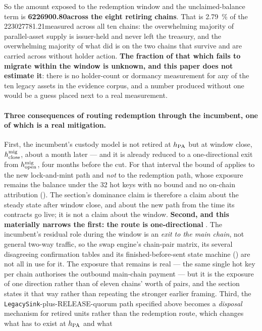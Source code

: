 \noindent So the amount exposed to the redemption window and the unclaimed-balance term is
\textbf{\num{6226900.80}\flux across the eight retiring chains}. That is \SI{2.79}{\percent} of
the \num{223027781.21}\flux measured across all ten chains: the overwhelming majority of parallel-asset supply is
issuer-held and never left the treasury, and the overwhelming majority of what did is on the two
chains that survive and are carried across without holder action. \textbf{The fraction of that which fails to migrate
within the window is unknown, and this paper does not estimate it}: there is no holder-count or
dormancy measurement for any of the ten legacy assets in the evidence corpus, and a number produced
without one would be a guess placed next to a real measurement.

\paragraph{Three consequences of routing redemption through the incumbent, one of which is a real
mitigation.} First, the incumbent's custody model is not retired at $h_{\mathrm{PA}}$ but at window close, $h^{\mathrm{mig}}_{\mathrm{close}}$,
about a month later --- and it is already reduced to a one-directional exit from $h^{\mathrm{mig}}_{\mathrm{open}}$, four
months before the cut. For that interval the bound of  applies to the new
lock-and-mint path and \emph{not} to the redemption path, whose exposure remains the balance under
the 32 hot keys with no bound and no on-chain attribution (). The section's
dominance claim is therefore a claim about the steady state after window close, and about the new
path from the time its contracts go live; it is not a claim about the window. \textbf{Second, and this materially narrows
the first: the route is one-directional} . The incumbent's
residual role during the window is an \emph{exit to the main chain}, not general two-way traffic, so
the swap engine's chain-pair matrix, its several disagreeing confirmation tables and its
finished-before-sent state machine () are not all in use for it. The
exposure that remains is real --- the same single hot key per chain authorises the outbound main-chain
payment --- but it is the exposure of one direction rather than of eleven chains' worth of pairs, and
the section states it that way rather than repeating the stronger earlier framing. Third, the
\texttt{LegacySink}-plus-RELEASE-quorum path specified above becomes a \emph{disposal} mechanism for
retired units rather than the redemption route, which changes what has to exist at $h_{\mathrm{PA}}$ and what
